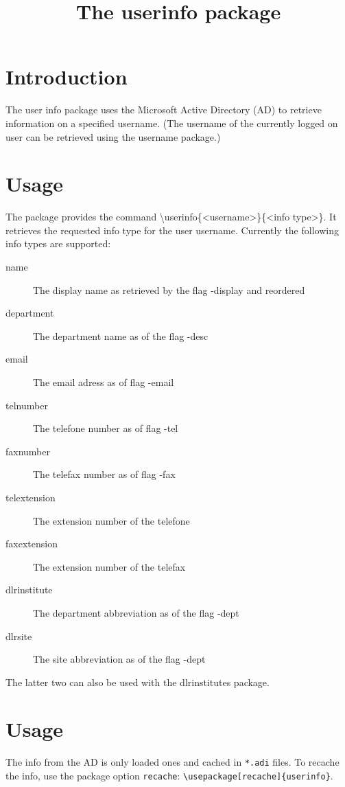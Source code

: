 \documentclass{article}
\title{The userinfo package}
\author{\userinfo{\username}{name}}
\begin{document}
\maketitle

\section{Introduction}
The user info package uses the Microsoft Active Directory (AD) to retrieve information on a specified username. (The username of the currently logged on user can be retrieved using the username package.) 

\section{Usage}
The package provides the command \textbackslash userinfo\{\textless username\textgreater\}\{\textless info type\textgreater\}. It retrieves the requested info type for the user username. Currently the following info types are supported:
\begin{description}
	\item[name]         The display name as retrieved by the flag -display and reordered
	\item[department]   The department name as of the flag -desc
	\item[email]        The email adress as of flag -email
	\item[telnumber]    The telefone number as of flag -tel
	\item[faxnumber]    The telefax number as of flag -fax
	\item[telextension] The extension number of the telefone
	\item[faxextension] The extension number of the telefax
	\item[dlrinstitute] The department abbreviation as of the flag -dept
	\item[dlrsite]      The site abbreviation as of the flag -dept
\end{description}
The latter two can also be used with the dlrinstitutes package.


\section{Usage}
The info from the AD is only loaded ones and cached in \texttt{*.adi} files. To recache the info, use the package option \texttt{recache}: \texttt{\textbackslash usepackage[recache]\{userinfo\}}.
\end{document}
